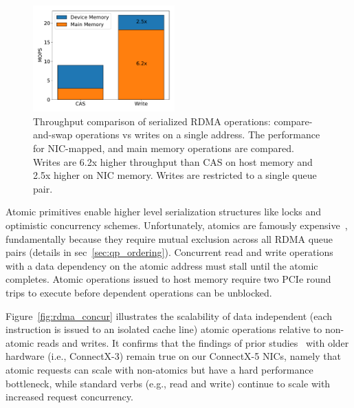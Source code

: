 \begin{figure}[t]
  \includegraphics[width=0.485\textwidth]{fig/cas_vs_writes.pdf}

    \caption{ Throughput comparison of serialized RDMA operations:
    compare-and-swap operations vs writes on a single address. The performance
    for NIC-mapped, and main memory operations are compared. Writes are 6.2x
    higher throughput than CAS on host memory and 2.5x higher on NIC memory.
    Writes are restricted to a single queue pair.  }

    \label{fig:cas_vs_writes}
\end{figure}

Atomic primitives enable higher level serialization structures like locks and
optimistic concurrency schemes. Unfortunately, atomics are famously
expensive~\cite{design-guidelines}, fundamentally because they require mutual
exclusion across all RDMA queue pairs (details in sec~\ref{sec:qp_ordering}).
Concurrent read and write operations with a data dependency on the atomic
address must stall until the atomic completes. Atomic operations issued to host
memory require two PCIe round trips to execute before dependent operations can
be unblocked.


Figure~\ref{fig:rdma_concur} illustrates the scalability of data independent
(each instruction is issued to an isolated cache line) atomic operations
relative to non-atomic reads and writes.  It confirms that the findings of prior
studies~\cite[Fig. 14]{design-guidelines} with older hardware (i.e., ConnectX-3)
remain true on our ConnectX-5 NICs, namely that atomic requests can scale with
non-atomics but have a hard performance bottleneck, while standard verbs (e.g.,
read and write) continue to scale with increased request concurrency.

